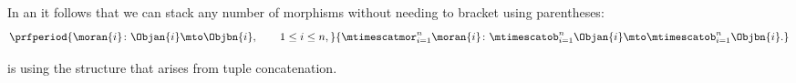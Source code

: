 \begin{remark}
    In an   it follows that we can stack any number of morphisms without needing to bracket using parentheses:
    \begin{equation}
        \prfperiod{
            \moran{i} \colon \Objan{i} \mto \Objbn{i}, \qquad 1 \leq i \leq n,
        }{
            \mtimescatmor_{i=1}^n \moran{i} \colon \mtimescatob_{i=1}^n \Objan{i} \mto \mtimescatob_{i=1}^n \Objbn{i}.
        }
    \end{equation}
\end{remark}
\clearpage
\begin{lemma}
    \label{lem:SetL-is-associative-stacking}
    \SetL is   using the structure that arises from tuple concatenation.
\end{lemma}
